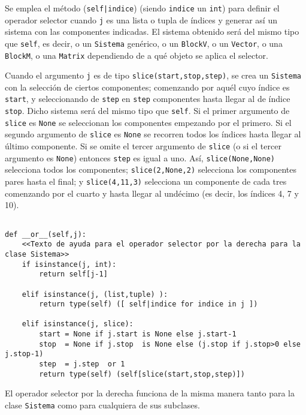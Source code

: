 \documentclass[11pt]{report}
\begin{document}
Se emplea el método (\texttt{self|indice}) (siendo \texttt{indice} un \texttt{int}) para
definir el operador selector cuando \texttt{j} es una lista o tupla de
índices y generar así un sistema con las componentes indicadas. El
sistema obtenido será del mismo tipo que \texttt{self}, es decir, o un
\texttt{Sistema} genérico, o un \texttt{BlockV}, o un \texttt{Vector}, o una \texttt{BlockM}, o
una \texttt{Matrix} dependiendo de a qué objeto se aplica el selector.

Cuando el argumento \texttt{j} es de tipo \texttt{slice(start,stop,step)}, se crea
un \texttt{Sistema} con la selección de ciertos componentes; comenzando por
aquél cuyo índice es \texttt{start}, y seleccionando de \texttt{step} en \texttt{step}
componentes hasta llegar al de índice \texttt{stop}. Dicho sistema será del
mismo tipo que \texttt{self}. Si el primer argumento de \texttt{slice} es \texttt{None} se
seleccionan los componentes empezando por el primero. Si el segundo
argumento de \texttt{slice} es \texttt{None} se recorren todos los índices hasta
llegar al último componente. Si se omite el tercer argumento de
\texttt{slice} (o si el tercer argumento es \texttt{None}) entonces \texttt{step} es igual
a uno. Así, \texttt{slice(None,None)} selecciona todos los componentes;
\texttt{slice(2,None,2)} selecciona los componentes pares hasta el final; y
\texttt{slice(4,11,3)} selecciona un componente de cada tres comenzando por
el cuarto y hasta llegar al undécimo (es decir, los índices 4, 7 y
10).

\begin{verbatim}

def __or__(self,j):
    <<Texto de ayuda para el operador selector por la derecha para la clase Sistema>>
    if isinstance(j, int):
        return self[j-1]
        
    elif isinstance(j, (list,tuple) ):
        return type(self) ([ self|indice for indice in j ])
    
    elif isinstance(j, slice):
        start = None if j.start is None else j.start-1 
        stop  = None if j.stop  is None else (j.stop if j.stop>0 else j.stop-1)
        step  = j.step  or 1
        return type(self) (self[slice(start,stop,step)])

\end{verbatim}

El operador selector por la derecha funciona de la misma manera tanto
para la clase \texttt{Sistema} como para cualquiera de sus subclases.
\end{document}
